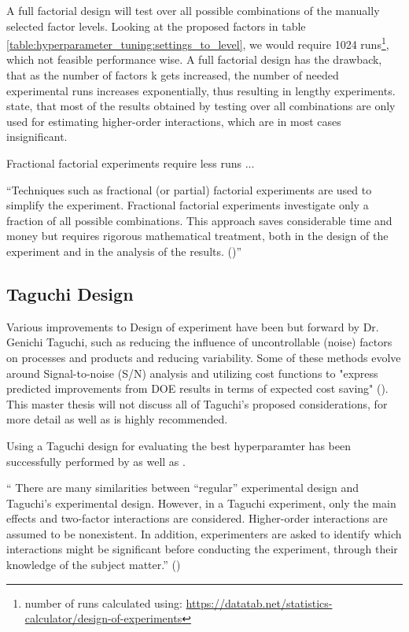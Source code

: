A full factorial design will test over all possible combinations of the manually selected factor levels. Looking at the proposed factors in table \ref{table:hyperparameter_tuning:settings_to_level}, we would require 1024 runs\footnote{number of runs calculated using: \url{https://datatab.net/statistics-calculator/design-of-experiments}}, which not feasible performance wise. A full factorial design has the drawback, that as the number of factors k gets increased, the number of needed experimental runs increases exponentially, thus resulting in lengthy experiments. \cite{yang_design_2009} state, that most of the results obtained by testing over all combinations are only used for estimating higher-order interactions, which are in most cases insignificant.

Fractional factorial experiments require less runs ... 

\enquote{Techniques such as fractional (or partial) factorial experiments are used to simplify the experiment. Fractional factorial experiments investigate only a fraction of all possible combinations. This approach saves considerable time and money but requires rigorous mathematical treatment, both in the design of the experiment and in the analysis of the results. (\cite{roy_primer_1990})}


\subsection{Taguchi Design}
Various improvements to Design of experiment have been but forward by Dr. Genichi Taguchi, such as reducing the influence of uncontrollable (noise) factors on processes and products and reducing variability. Some of these methods evolve around Signal-to-noise (S/N) analysis and utilizing cost functions to "express predicted improvements from DOE results in terms of expected cost saving" (\cite{roy_primer_1990}). This master thesis will not discuss all of Taguchi's proposed considerations, for more detail \cite{roy_primer_1990} as well as \cite{yang_design_2009} is highly recommended.


Using a Taguchi design for evaluating the best hyperparamter has been successfully performed by \cite{dao_maximising_2016} as well as \cite{naruka_parameter_2019}. 

\enquote{ There are many similarities between “regular” experimental design and Taguchi's experimental design. However, in a Taguchi experiment, only the main effects and two-factor interactions are considered. Higher-order interactions are assumed to be nonexistent. In addition, experimenters are asked to identify which interactions might be significant before conducting the experiment, through their knowledge of the subject matter.} (\cite{yang_design_2009})

